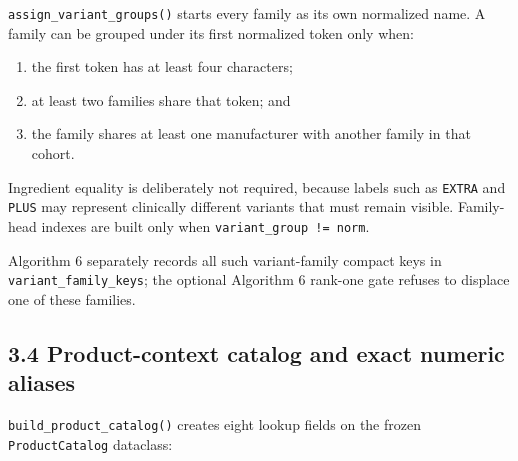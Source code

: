 \texttt{assign\_\allowbreak{}variant\_\allowbreak{}groups()} starts every family as its own normalized name. A family can be grouped under its first normalized token only when:

\begin{enumerate}
\def\labelenumi{\arabic{enumi}.}
\tightlist
\item
  the first token has at least four characters;
\item
  at least two families share that token; and
\item
  the family shares at least one manufacturer with another family in that cohort.
\end{enumerate}

Ingredient equality is deliberately not required, because labels such as \texttt{EXTRA} and \texttt{PLUS} may represent clinically different variants that must remain visible. Family-head indexes are built only when \texttt{variant\_\allowbreak{}group\ !=\ norm}.

Algorithm 6 separately records all such variant-family compact keys in \texttt{variant\_\allowbreak{}family\_\allowbreak{}keys}; the optional Algorithm 6 rank-one gate refuses to displace one of these families.

\subsection{3.4 Product-context catalog and exact numeric aliases}\label{34-product-context-catalog-and-exact-numeric-aliases}

\texttt{build\_\allowbreak{}product\_\allowbreak{}catalog()} creates eight lookup fields on the frozen \texttt{ProductCatalog} dataclass:

